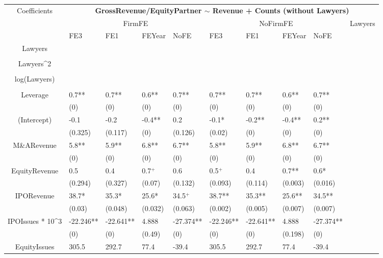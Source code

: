 \documentclass{article}
\begin{document}
\begin{table}[H]
\centering
\begin{tabular}{|clllllllll|}
\hline
\multirow{3}{*}{Coefficients} & \multicolumn{9}{c|}{\textbf{GrossRevenue/EquityPartner $\sim$ Revenue + Counts (without Lawyers)}} \\
\cline{2-10}
& \multicolumn{4}{c}{FirmFE} & \multicolumn{4}{c}{NoFirmFE} & \multirow{2}{*}{Lawyers} \\
\cline{2-9}
& FE3 & FE1 & FEYear & NoFE & FE3 & FE1 & FEYear & NoFE &  \\
\hline
 
Lawyers &  &  &  &  &  &  &  &  & \\ 
   &  &  &  &  &  &  &  &  & \\ 
  Lawyers^2 &  &  &  &  &  &  &  &  & \\ 
   &  &  &  &  &  &  &  &  & \\ 
  log(Lawyers) &  &  &  &  &  &  &  &  & \\ 
   &  &  &  &  &  &  &  &  & \\ 
  Leverage & 0.7** & 0.7** & 0.6** & 0.7** & 0.7** & 0.7** & 0.6** & 0.7** & \\ 
   & (0) & (0) & (0) & (0) & (0) & (0) & (0) & (0) & \\ 
  (Intercept) & -0.1 & -0.2 & -0.4** & 0.2 & -0.1* & -0.2** & -0.4** & 0.2** & \\ 
   & (0.325) & (0.117) & (0) & (0.126) & (0.02) & (0) & (0) & (0) & \\ 
  M\&ARevenue & 5.8** & 5.9** & 6.8** & 6.7** & 5.8** & 5.9** & 6.8** & 6.7** & \\ 
   & (0) & (0) & (0) & (0) & (0) & (0) & (0) & (0) & \\ 
  EquityRevenue & 0.5 & 0.4 & 0.7$^{+}$ & 0.6 & 0.5$^{+}$ & 0.4 & 0.7** & 0.6* & \\ 
   & (0.294) & (0.327) & (0.07) & (0.132) & (0.093) & (0.114) & (0.003) & (0.016) & \\ 
  IPORevenue & 38.7* & 35.3* & 25.6* & 34.5$^{+}$ & 38.7** & 35.3** & 25.6** & 34.5** & \\ 
   & (0.03) & (0.048) & (0.032) & (0.063) & (0.002) & (0.005) & (0.007) & (0.007) & \\ 
  IPOIssues * 10^3 & -22.246** & -22.641** & 4.888 & -27.374** & -22.246** & -22.641** & 4.888 & -27.374** & \\ 
   & (0) & (0) & (0.49) & (0) & (0) & (0) & (0.198) & (0) & \\ 
  EquityIssues & 305.5 & 292.7 & 77.4 & -39.4 & 305.5 & 292.7 & 77.4 & -39.4 & \\ 

\end{tabular}
\end{table}
\end{document}
